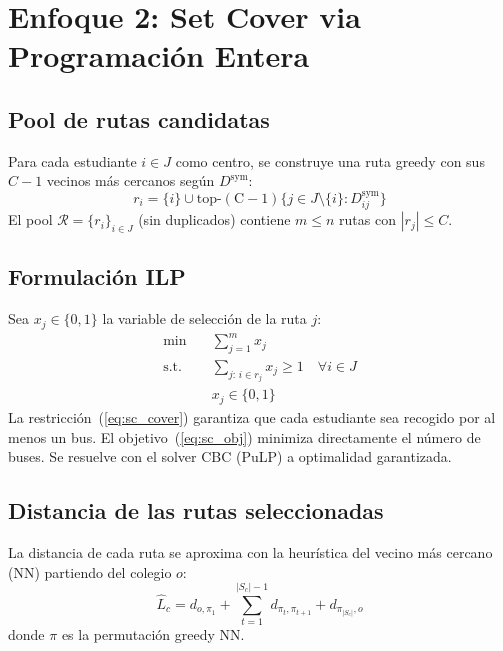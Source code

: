 \documentclass[12pt,a4paper]{article}
\begin{document}
\section{Enfoque 2: Set Cover via Programaci\'on Entera}

\subsection{Pool de rutas candidatas}

Para cada estudiante $i\in J$ como centro, se construye una ruta greedy
con sus $C-1$ vecinos m\'as cercanos seg\'un $D^{\mathrm{sym}}$:
\begin{equation}
  r_i = \{i\}\cup
        \operatorname{top\text{-}(C-1)}\bigl\{j\in J\setminus\{i\}:
        D^{\mathrm{sym}}_{ij}\bigr\}
\end{equation}
El pool $\mathcal{R}=\{r_i\}_{i\in J}$ (sin duplicados) contiene
$m\leq n$ rutas con $|r_j|\leq C$.

\subsection{Formulaci\'on ILP}

Sea $x_j\in\{0,1\}$ la variable de selecci\'on de la ruta $j$:
\begin{align}
  \min \quad & \sum_{j=1}^{m} x_j \label{eq:sc_obj}\\
  \text{s.t.}\quad
  & \sum_{j:\,i\in r_j} x_j \geq 1 \quad\forall i\in J \label{eq:sc_cover}\\
  & x_j\in\{0,1\} \label{eq:sc_bin}
\end{align}
La restricci\'on~(\ref{eq:sc_cover}) garantiza que cada estudiante sea recogido
por al menos un bus.  El objetivo~(\ref{eq:sc_obj}) minimiza directamente el
n\'umero de buses.  Se resuelve con el solver CBC (PuLP) a optimalidad garantizada.

\subsection{Distancia de las rutas seleccionadas}

La distancia de cada ruta se aproxima con la heur\'istica del vecino m\'as
cercano (NN) partiendo del colegio $o$:
\begin{equation}
  \hat{L}_c = d_{o,\pi_1}
            + \sum_{t=1}^{|S_c|-1} d_{\pi_t,\pi_{t+1}}
            + d_{\pi_{|S_c|},o}
\end{equation}
donde $\pi$ es la permutaci\'on greedy NN.
\end{document}
